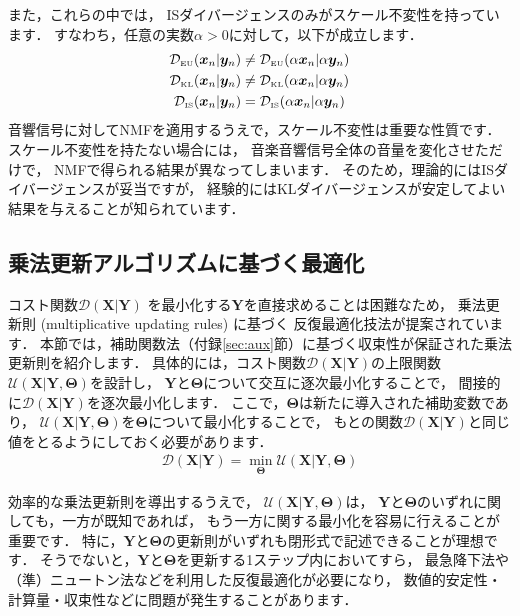 また，これらの中では，
ISダイバージェンスのみがスケール不変性を持っています．
すなわち，任意の実数$\alpha>0$に対して，以下が成立します．
\begin{align}
\mathcal{D}_{\mbox{\tiny EU}}(\bm{x}_n|\bm{y}_n) &\ne \mathcal{D}_{\mbox{\tiny EU}}(\alpha \bm{x}_n | \alpha \bm{y}_n)\\
\mathcal{D}_{\mbox{\tiny KL}}(\bm{x}_n|\bm{y}_n) &\ne \mathcal{D}_{\mbox{\tiny KL}}(\alpha \bm{x}_n | \alpha \bm{y}_n)\\
\mathcal{D}_{\mbox{\tiny IS}}(\bm{x}_n|\bm{y}_n) &=   \mathcal{D}_{\mbox{\tiny IS}}(\alpha \bm{x}_n | \alpha \bm{y}_n)
\end{align}
音響信号に対してNMFを適用するうえで，スケール不変性は重要な性質です．
スケール不変性を持たない場合には，
音楽音響信号全体の音量を変化させただけで，
NMFで得られる結果が異なってしまいます．
そのため，理論的にはISダイバージェンスが妥当ですが，
経験的にはKLダイバージェンスが安定してよい結果を与えることが知られています．

\subsection{乗法更新アルゴリズムに基づく最適化}
\label{sec:nmf_mu}

コスト関数$\mathcal{D}(\bm{X}|\bm{Y})$
を最小化する$\bm{Y}$を直接求めることは困難なため，
乗法更新則 (multiplicative updating rules) に基づく
反復最適化技法が提案されています\cite{kameoka:asjj:2012}．
本節では，補助関数法（付録\ref{sec:aux}節）に基づく収束性が保証された乗法更新則を紹介します．
具体的には，コスト関数$\mathcal{D}(\bm{X}|\bm{Y})$の上限関数$\mathcal{U}(\bm{X}|\bm{Y},\bm\Theta)$を設計し，
$\bm{Y}$と$\bm\Theta$について交互に逐次最小化することで，
間接的に$\mathcal{D}(\bm{X}|\bm{Y})$を逐次最小化します．
ここで，$\bm\Theta$は新たに導入された補助変数であり，
$\mathcal{U}(\bm{X}|\bm{Y},\bm\Theta)$を$\bm\Theta$について最小化することで，
もとの関数$\mathcal{D}(\bm{X}|\bm{Y})$と同じ値をとるようにしておく必要があります．
\begin{align}
\mathcal{D}(\bm{X}|\bm{Y}) = \min_{\bm\Theta} \mathcal{U}(\bm{X}|\bm{Y},\bm\Theta)
\end{align}

効率的な乗法更新則を導出するうえで，
$\mathcal{U}(\bm{X}|\bm{Y},\bm\Theta)$は，
$\bm{Y}$と$\bm\Theta$のいずれに関しても，一方が既知であれば，
もう一方に関する最小化を容易に行えることが重要です．
特に，$\bm{Y}$と$\bm\Theta$の更新則がいずれも閉形式で記述できることが理想です．
そうでないと，$\bm{Y}$と$\bm\Theta$を更新する1ステップ内においてすら，
最急降下法や（準）ニュートン法などを利用した反復最適化が必要になり，
数値的安定性・計算量・収束性などに問題が発生することがあります．

